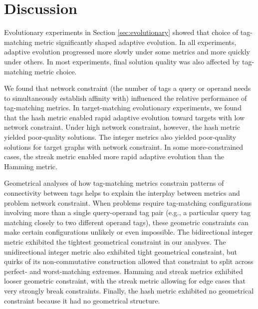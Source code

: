 \section{Discussion}


% 

Evolutionary experiments in Section \ref{sec:evolutionary} showed that choice of tag-matching metric significantly shaped adaptive evolution.
In all experiments, adaptive evolution progressed more slowly under some metrics and more quickly under others.
In most experiments, final solution quality was also affected by tag-matching metric choice.

We found that network constraint (the number of tags a query or operand needs to simultaneously establish affinity with) influenced the relative performance of tag-matching metrics.
In target-matching evolutionary experiments, we found that the hash metric enabled rapid adaptive evolution toward targets with low network constraint.
Under high network constraint, however, the hash metric yielded poor-quality solutions.
The integer metrics also yielded poor-quality solutions for target graphs with network constraint.
In some more-constrained cases, the streak metric enabled more rapid adaptive evolution than the Hamming metric.

Geometrical analyses of how tag-matching metrics constrain patterns of connectivity between tags helps to explain the interplay between metrics and problem network constraint.
When problems require tag-matching configurations involving more than a single query-operand tag pair (e.g., a particular query tag matching closely to two different operand tags), these geometric constraints can make certain configurations unlikely or even impossible.
The bidirectional integer metric exhibited the tightest geometrical constraint in our analyses.
The unidirectional integer metric also exhibited tight geometrical constraint, but quirks of its non-commutative construction allowed that constraint to split across perfect- and worst-matching extremes.
Hamming and streak metrics exhibited looser geometric constraint, with the streak metric allowing for edge cases that very strongly break constraints.
Finally, the hash metric exhibited no geometrical constraint because it had no geometrical structure.


